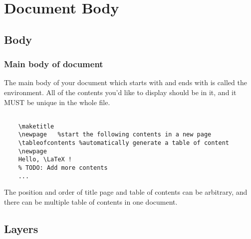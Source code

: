 \section{Document Body}

\begin{frame}
\end{frame}

\subsection{Body}
\begin{frame}[fragile]
	\frametitle{Main body of document}
	The main body of your document which starts with \texttt{} and ends with \texttt{} is called the  environment. All of the contents you'd like to display should be in it, and it \alert{MUST} be \alert{unique} in the whole file.
	\begin{example}
		\begin{verbatim}

    \maketitle
    \newpage   %start the following contents in a new page
    \tableofcontents %automatically generate a table of content
    \newpage
    Hello, \LaTeX !
    % TODO: Add more contents
    ...

		\end{verbatim}
	\end{example}
	The position and order of title page and table of contents can be arbitrary, and there can be multiple table of contents in one document.
\end{frame}

\subsection{Layers}


